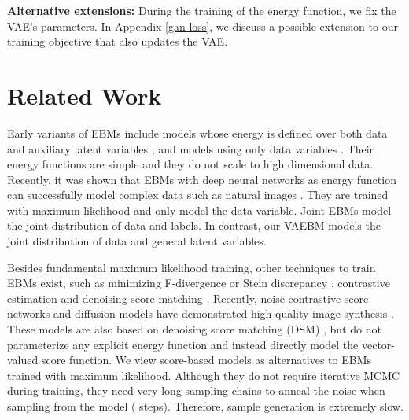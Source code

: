 \documentclass{article} \usepackage{iclr2021_conference,times}
\begin{document}
\textbf{Alternative extensions: } During the training of the energy function, we fix the VAE's parameters. In Appendix \ref{gan loss}, we discuss a possible extension to our training objective that also updates the VAE.  

 \vspace{-0.5em}
\section{Related Work}

Early variants of EBMs include models whose energy is defined over both data and auxiliary latent variables \citep{salakhutdinov2009deep,hinton2012practical}, and models using only data variables \citep{hinton2002training, mnih2005learning}. Their energy functions are simple and they do not scale to high dimensional data. Recently, it was shown that EBMs with deep neural networks as energy function can successfully model complex data such as natural images \citep{du2019implicit, nijkamp2019learning,nijkamp2019anatomy}. They are trained with maximum likelihood and only model the data variable. Joint EBMs \citep{grathwohl2020your,liu2020hybrid} model the joint distribution of data and labels. In contrast, our VAEBM models the joint distribution of data and general latent variables.

Besides fundamental maximum likelihood training, other techniques to train EBMs exist, such as minimizing F-divergence \citep{yu2020training} or Stein discrepancy \citep{grathwohl2020cutting}, contrastive estimation \citep{gutmann2010noise, gao2020flow} and denoising score matching \citep{li2019annealed}. Recently, noise contrastive score networks and diffusion models have demonstrated high quality image synthesis \citep{song2019generative,song2020improved,ho2020denoising}. These models are also based on denoising score matching (DSM) \citep{vincent2011connection}, but do not parameterize any explicit energy function and instead directly model the vector-valued score function. We view score-based models as alternatives to EBMs trained with maximum likelihood. Although they do not require iterative MCMC during training, they need very long sampling chains to anneal the noise when sampling from the model ( steps). Therefore, sample generation is extremely slow.
\end{document}
